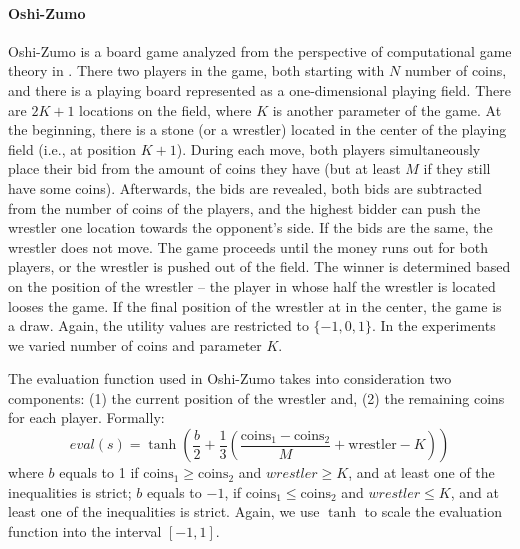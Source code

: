 \paragraph{\textbf{Oshi-Zumo}}
Oshi-Zumo is a board game analyzed from the perspective of computational game theory in \cite{buro2003}.
There two players in the game, both starting with $N$ number of coins, and there is a playing board represented as a one-dimensional playing field. 
There are $2K+1$ locations on the field, where $K$ is another parameter of the game.
At the beginning, there is a stone (or a wrestler) located in the center of the playing field (i.e., at position $K+1$).
During each move, both players simultaneously place their bid from the amount of coins they have (but at least $M$ if they still have some coins).
Afterwards, the bids are revealed, both bids are subtracted from the number of coins of the players, and the highest bidder can push the wrestler one location towards the opponent's side.
If the bids are the same, the wrestler does not move. 
The game proceeds until the money runs out for both players, or the wrestler is pushed out of the field. 
The winner is determined based on the position of the wrestler -- the player in whose half the wrestler is located looses the game. 
If the final position of the wrestler at in the center, the game is a draw.
Again, the utility values are restricted to $\lbrace -1, 0, 1 \rbrace$.
In the experiments we varied number of coins and parameter $K$.

The evaluation function used in Oshi-Zumo takes into consideration two components: (1) the current position of the wrestler and, (2) the remaining coins for each player. Formally:
$$
eval(s) = \tanh\left(\frac{b}{2}+\frac{1}{3}\left(\frac{\textrm{coins}_1 - \textrm{coins}_2}{M} + \textrm{wrestler} - K\right)\right)
$$
where $b$ equals to 1 if $\textrm{coins}_1 \geq \textrm{coins}_2$ and $wrestler \geq K$, and at least one of the inequalities is strict;
$b$ equals to $-1$, if $\textrm{coins}_1 \leq \textrm{coins}_2$ and $wrestler \leq K$, and at least one of the inequalities is strict.
Again, we use $\tanh$ to scale the evaluation function into the interval $[-1,1]$.

